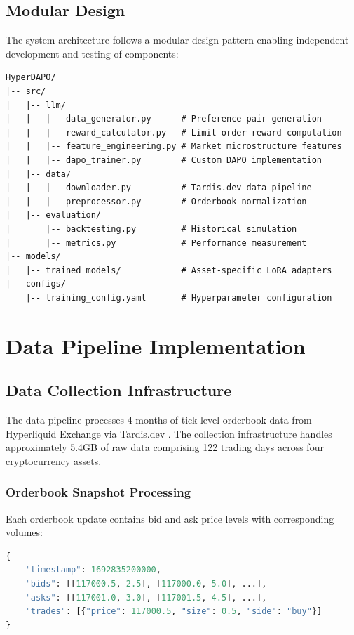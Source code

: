 \documentclass{report}
\begin{document}
\subsection{Modular Design}

The system architecture follows a modular design pattern enabling independent development and testing of components:

\begin{verbatim}
HyperDAPO/
|-- src/
|   |-- llm/
|   |   |-- data_generator.py      # Preference pair generation
|   |   |-- reward_calculator.py   # Limit order reward computation
|   |   |-- feature_engineering.py # Market microstructure features
|   |   |-- dapo_trainer.py        # Custom DAPO implementation
|   |-- data/
|   |   |-- downloader.py          # Tardis.dev data pipeline
|   |   |-- preprocessor.py        # Orderbook normalization
|   |-- evaluation/
|       |-- backtesting.py         # Historical simulation
|       |-- metrics.py             # Performance measurement
|-- models/
|   |-- trained_models/            # Asset-specific LoRA adapters
|-- configs/
    |-- training_config.yaml       # Hyperparameter configuration
\end{verbatim}

\section{Data Pipeline Implementation}

\subsection{Data Collection Infrastructure}

The data pipeline processes 4 months of tick-level orderbook data from Hyperliquid Exchange via Tardis.dev \cite{Tardis2024}. The collection infrastructure handles approximately 5.4GB of raw data comprising 122 trading days across four cryptocurrency assets.

\subsubsection{Orderbook Snapshot Processing}

Each orderbook update contains bid and ask price levels with corresponding volumes:

\begin{lstlisting}[language=Python, caption=Orderbook data structure]
{
    "timestamp": 1692835200000,
    "bids": [[117000.5, 2.5], [117000.0, 5.0], ...],
    "asks": [[117001.0, 3.0], [117001.5, 4.5], ...],
    "trades": [{"price": 117000.5, "size": 0.5, "side": "buy"}]
}
\end{lstlisting}
\end{document}
